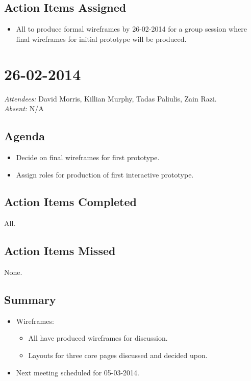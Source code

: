 \documentclass{article}
\begin{document}
\subsection{Action Items Assigned}
\begin{itemize}
\item All to produce formal wireframes by 26-02-2014 for a group session where final wireframes for initial prototype will be produced.
\end{itemize}


\clearpage

\section*{26-02-2014}
\vspace{0.5cm}
\emph{Attendees: }David Morris, Killian Murphy, Tadas Paliulis, Zain Razi.
\\
\emph{Absent: }N/A

\subsection*{Agenda}
\begin{itemize}
\item Decide on final wireframes for first prototype.
\item Assign roles for production of first interactive prototype.
\end{itemize}

\subsection*{Action Items Completed}
All.

\subsection*{Action Items Missed}
None.

\subsection*{Summary}
\begin{itemize}
\item Wireframes:
  \begin{itemize}
  \item All have produced wireframes for discussion.
  \item Layouts for three core pages discussed and decided upon.
  \end{itemize}
\item Next meeting scheduled for 05-03-2014.
\end{itemize}
\end{document}

